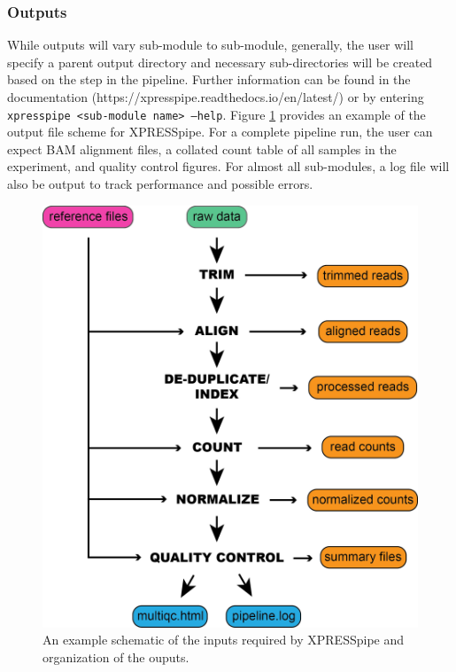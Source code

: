 \documentclass[11pt, a4paper, oneside]{article}
\begin{document}
\subsubsection{Outputs}
While outputs will vary sub-module to sub-module, generally, the user will specify a parent output directory and necessary sub-directories will be created based on the step in the pipeline. Further information can be found in the documentation (https://xpresspipe.readthedocs.io/en/latest/) or by entering \texttt{xpresspipe \textless sub-module name\textgreater \ --help}. Figure \ref{fig:outputs} provides an example of the output file scheme for XPRESSpipe. For a complete pipeline run, the user can expect BAM alignment files, a collated count table of all samples in the experiment, and quality control figures. For almost all sub-modules, a log file will also be output to track performance and possible errors.

\begin{figure}
\centering
  \includegraphics[width=120mm]{figures/xpresspipe_overview.png}
  \caption{An example schematic of the inputs required by XPRESSpipe and organization of the ouputs.}
  \label{fig:outputs}
\end{figure}
\end{document}

